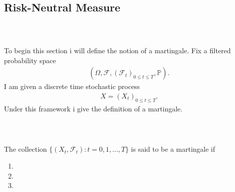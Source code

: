 \documentclass{beamer}
\numberwithin{equation}{section}
\begin{document}
\subsection{Risk-Neutral Measure}

\begin{frame}\frametitle{{\normalsize \secname} \\ {\large \subsecname}}
    To begin this section i will define the notion of a martingale.
    Fix a filtered probability space
    \begin{align}
        \left(
            \Omega, 
            \mathscr{F}, 
            \left(
                \mathscr{F}_t
            \right)_{0 \leq t \leq T},
            \mathbb{P}
        \right).
    \end{align}
    I am given a discrete time stochastic process
    \begin{align}
        X = (X_t)_{0 \leq t \leq T}. 
    \end{align}
    Under this framework i give the definition of a martingale.
\end{frame}

\begin{frame}\frametitle{{\normalsize \secname} \\ {\large \subsecname}}
    \begin{definition}[Martingale]\label{def:martingale}
        The collection $\{ (X_t, \mathscr{F}_t): t = 0,1, \ldots, T \}$ is said to be a martingale if
        \begin{enumerate}
            \item %
            \item %
            \item %
        \end{enumerate}
    \end{definition}
\end{frame}
\end{document}
